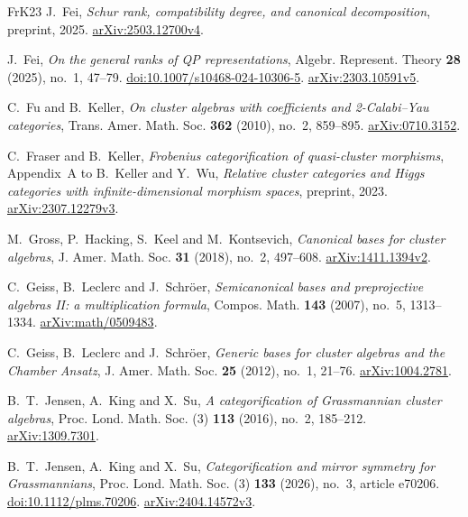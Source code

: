 \documentclass[11pt]{amsart}
\numberwithin{equation}{section}
\theoremstyle{definition}
\theoremstyle{remark}
\begin{document}
\begin{thebibliography}{FrK23}
J.~Fei, \emph{Schur rank, compatibility degree, and canonical decomposition},
preprint, 2025.
\href{https://arxiv.org/abs/2503.12700v4}{arXiv:2503.12700v4}.

J.~Fei, \emph{On the general ranks of QP representations},
Algebr. Represent. Theory \textbf{28} (2025), no.~1, 47--79.
\href{https://doi.org/10.1007/s10468-024-10306-5}{doi:10.1007/s10468-024-10306-5}.
\href{https://arxiv.org/abs/2303.10591v5}{arXiv:2303.10591v5}.

C.~Fu and B.~Keller,
\emph{On cluster algebras with coefficients and 2-Calabi--Yau categories},
Trans. Amer. Math. Soc. \textbf{362} (2010), no.~2, 859--895.
\href{https://arxiv.org/abs/0710.3152}{arXiv:0710.3152}.

C.~Fraser and B.~Keller,
\emph{Frobenius categorification of quasi-cluster morphisms},
Appendix~A to B.~Keller and Y.~Wu,
\emph{Relative cluster categories and Higgs categories with
infinite-dimensional morphism spaces}, preprint, 2023.
\href{https://arxiv.org/abs/2307.12279v3}{arXiv:2307.12279v3}.

M.~Gross, P.~Hacking, S.~Keel and M.~Kontsevich,
\emph{Canonical bases for cluster algebras},
J. Amer. Math. Soc. \textbf{31} (2018), no.~2, 497--608.
\href{https://arxiv.org/abs/1411.1394v2}{arXiv:1411.1394v2}.

C.~Geiss, B.~Leclerc and J.~Schr\"oer,
\emph{Semicanonical bases and preprojective algebras II: a multiplication formula},
Compos. Math. \textbf{143} (2007), no.~5, 1313--1334.
\href{https://arxiv.org/abs/math/0509483}{arXiv:math/0509483}.

C.~Geiss, B.~Leclerc and J.~Schr\"oer,
\emph{Generic bases for cluster algebras and the Chamber Ansatz},
J. Amer. Math. Soc. \textbf{25} (2012), no.~1, 21--76.
\href{https://arxiv.org/abs/1004.2781}{arXiv:1004.2781}.

B.~T.~Jensen, A.~King and X.~Su,
\emph{A categorification of Grassmannian cluster algebras},
Proc. Lond. Math. Soc. (3) \textbf{113} (2016), no.~2, 185--212.
\href{https://arxiv.org/abs/1309.7301}{arXiv:1309.7301}.

B.~T.~Jensen, A.~King and X.~Su,
\emph{Categorification and mirror symmetry for Grassmannians},
Proc. Lond. Math. Soc. (3) \textbf{133} (2026), no.~3, article e70206.
\href{https://doi.org/10.1112/plms.70206}{doi:10.1112/plms.70206}.
\href{https://arxiv.org/abs/2404.14572v3}{arXiv:2404.14572v3}.


\end{thebibliography}
\end{document}
